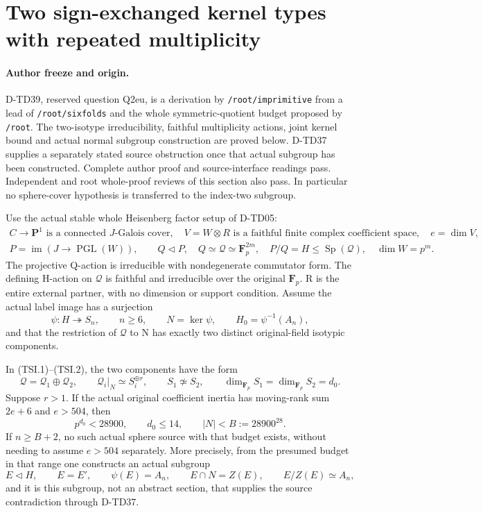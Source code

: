 \section{Two sign-exchanged kernel types with repeated multiplicity}
\label{sec:heisenberg-two-isotype-symmetric}

\paragraph{Author freeze and origin.}
D-TD39, reserved question Q2eu, is a derivation by
\texttt{/root/imprimitive} from a lead of \texttt{/root/sixfolds}
and the whole symmetric-quotient budget proposed by \texttt{/root}.
The two-isotype irreducibility, faithful multiplicity actions,
joint kernel bound and actual normal subgroup construction are
proved below.  D-TD37 supplies a separately stated source
obstruction once that actual subgroup has been constructed.
Complete author proof and source-interface readings pass.
Independent and root whole-proof reviews of this section also pass.
In particular no sphere-cover hypothesis is transferred to the
index-two subgroup.

Use the actual stable whole Heisenberg factor setup of D-TD05:
\[
 \begin{gathered}
 C\longrightarrow\mathbf P^1\text{ is a connected }J\text{-Galois cover},
 \quad V=W\otimes R\text{ is a faithful finite complex coefficient space},
 \quad e=\dim V,\\
 P=\operatorname{im}(J\to\operatorname{PGL}(W)),\qquad
 Q\triangleleft P,\quad Q\simeq\mathcal Q\simeq\mathbf F_p^{2m},
 \quad P/Q=H\le\operatorname{Sp}(\mathcal Q),\quad \dim W=p^m.
 \end{gathered}
 \tag{TSI.1}
\]
The projective Q-action is irreducible with nondegenerate
commutator form.  The defining H-action on \(\mathcal Q\) is
faithful and irreducible over the original \(\mathbf F_p\).
R is the entire external partner, with no dimension or support
condition.  Assume the actual label image has a surjection
\[
 \psi:H\twoheadrightarrow S_n,\qquad n\ge6,
 \qquad N=\ker\psi,\qquad H_0=\psi^{-1}(A_n),
 \tag{TSI.2}
\]
and that the restriction of \(\mathcal Q\) to N has exactly
two distinct original-field isotypic components.

\begin{theorem}[D-TD39]
In (TSI.1)--(TSI.2), the two components have the form
\[
 \mathcal Q=\mathcal Q_1\oplus\mathcal Q_2,
 \qquad \mathcal Q_i\big|_N\simeq S_i^{\oplus r},
 \qquad S_1\not\simeq S_2,
 \qquad \dim_{\mathbf F_p}S_1=\dim_{\mathbf F_p}S_2=d_0.
 \tag{TSI.3}
\]
Suppose \(r>1\).  If the actual original coefficient inertia
has moving-rank sum \(2e+6\) and \(e>504\), then
\[
                  p^{d_0}<28900,\qquad d_0\le14,
                  \qquad |N|<B:=28900^{28}.
 \tag{TSI.4}
\]
If \(n\ge B+2\), no such actual sphere source with that budget
exists, without needing to assume \(e>504\) separately.  More
precisely, from the presumed budget in that range one constructs
an actual subgroup
\[
 E\triangleleft H,\qquad E=E',\qquad
 \psi(E)=A_n,\qquad E\cap N=Z(E),\qquad E/Z(E)\simeq A_n,
 \tag{TSI.5}
\]
and it is this subgroup, not an abstract section, that supplies
the source contradiction through D-TD37.
\end{theorem}

